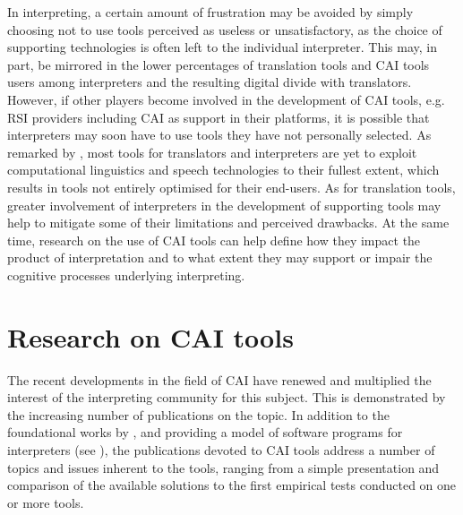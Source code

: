 In interpreting, a certain amount of frustration may be avoided by simply choosing not to use tools perceived as useless or unsatisfactory, as the choice of supporting technologies is often left to the individual interpreter. This may, in part, be mirrored in the lower percentages of translation tools and CAI tools users among interpreters and the resulting digital divide with translators. However, if other players become involved in the development of CAI tools, e.g. RSI providers including CAI as support in their platforms, it is possible that interpreters may soon have to use tools they have not personally selected. 
As remarked by \citet{hansen2012nutzbarkeit}, most tools for translators and interpreters are yet to exploit computational linguistics and speech technologies to their fullest extent, which results in tools not entirely optimised for their end-users. As for translation tools, greater involvement of interpreters in the development of supporting tools may help to mitigate some of their limitations and perceived drawbacks. At the same time, research on the use of CAI tools can help define how they impact the product of interpretation and to what extent they may support or impair the cognitive processes underlying interpreting.

\section{Research on CAI tools} \label{CAI_evaluation}
The recent developments in the field of CAI have renewed and multiplied the interest of the interpreting community for this subject. This is demonstrated by the increasing number of publications on the topic. In addition to the foundational works by \citet{rutten_terminologieprogramme_2000,rutten_why_2004,rutten_informations-_2007}, \citet{stoll_jenseits_2009} and \citet{will_bemerkungen_2000,will_terminology_2007} providing a model of software programs for interpreters (see ), the publications devoted to CAI tools address a number of topics and issues inherent to the tools, ranging from a simple presentation and comparison of the available solutions to the first empirical tests conducted on one or more tools.

